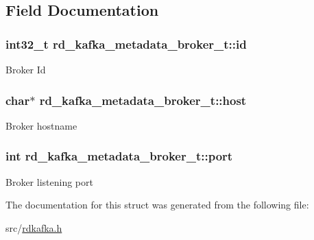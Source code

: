 \subsection{Field Documentation}
\hypertarget{structrd__kafka__metadata__broker__t_a4429aaa53ac19ed33856323242899f9c}{
\subsubsection[{id}]{\setlength{\rightskip}{0pt plus 5cm}int32\_\-t {\bf rd\_\-kafka\_\-metadata\_\-broker\_\-t::id}}}
\label{structrd__kafka__metadata__broker__t_a4429aaa53ac19ed33856323242899f9c}
Broker Id \hypertarget{structrd__kafka__metadata__broker__t_a793daa60734030950ef9abdc97220284}{
\subsubsection[{host}]{\setlength{\rightskip}{0pt plus 5cm}char$\ast$ {\bf rd\_\-kafka\_\-metadata\_\-broker\_\-t::host}}}
\label{structrd__kafka__metadata__broker__t_a793daa60734030950ef9abdc97220284}
Broker hostname \hypertarget{structrd__kafka__metadata__broker__t_a669f85d48fd084f36a47f2654115b165}{
\subsubsection[{port}]{\setlength{\rightskip}{0pt plus 5cm}int {\bf rd\_\-kafka\_\-metadata\_\-broker\_\-t::port}}}
\label{structrd__kafka__metadata__broker__t_a669f85d48fd084f36a47f2654115b165}
Broker listening port 

The documentation for this struct was generated from the following file:\begin{DoxyCompactItemize}
\item 
src/\hyperlink{rdkafka_8h}{rdkafka.h}\end{DoxyCompactItemize}
